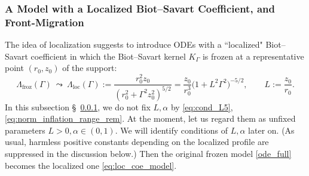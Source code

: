 \documentclass[reqno,11pt]{amsart}
\begin{document}
\subsubsection{A Model with a Localized Biot--Savart Coefficient, and Front-Migration}
\label{intro:front_mig}
The idea of localization suggests to introduce 
ODEs with a ``localized" Biot--Savart coefficient in which the Biot--Savart kernel $K_\Gamma$ is frozen at a representative point
$(r_0,z_0)$  of the support:
\begin{equation}\label{eq:Lambda_fr_intro}
    \Lambda_{\mathrm{froz}}(\Gamma)\ \leadsto\ \Lambda_{\mathrm{loc}}(\Gamma)
    :=
    \frac{r_0^2 z_0}{(r_0^2+\Gamma^2 z_0^2)^{5/2}}
    =
    \frac{z_0}{r_0^3}\Big(1+L^2\Gamma^2\Big)^{-5/2},
    \qquad
    L:=\frac{z_0}{r_0}.
\end{equation}
In this subsection \S~\ref{intro:front_mig}, we do not fix $L,\alpha$ by \eqref{eq:cond_L5}, \eqref{eq:norm_inflation_range_rem}. At the moment, let us regard them as unfixed parameters $L>0, \alpha\in (0,1)$. We will identify conditions of $L,\alpha$ later on.
(As usual, harmless positive constants depending on the localized profile are suppressed in
the discussion below.) Then the original frozen model \eqref{ode_full} becomes the localized one \eqref{eq:loc_coe_model}. 
\end{document}
